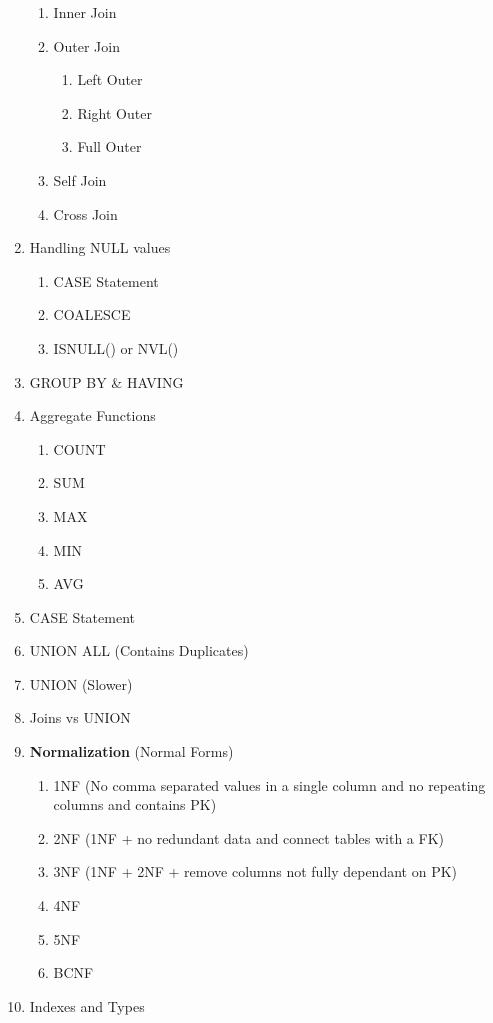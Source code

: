 \documentclass[11pt]{article}
\begin{document}
\begin{enumerate}
   \begin{enumerate}
   	\item Inner Join
   	\item Outer Join
   	\begin{enumerate}
   		\item Left Outer
   		\item Right Outer
   		\item Full Outer 
   	\end{enumerate}
   \item Self Join
   \item Cross Join
   \end{enumerate}
    \item Handling NULL values
    \begin{enumerate}
    	\item CASE Statement
    	\item COALESCE
    	\item ISNULL() or NVL()
    \end{enumerate}
    \item GROUP BY \& HAVING
    \item Aggregate Functions
    \begin{enumerate}
    	\item COUNT
    	\item SUM
    	\item MAX
    	\item MIN
    	\item AVG
    \end{enumerate}
   \item CASE Statement
    \item UNION ALL (Contains Duplicates)
    \item UNION (Slower)
    \item Joins vs UNION
	\item \textbf{Normalization} (Normal Forms)
	\begin{enumerate}
		\item 1NF (No comma separated values in a single column and no repeating columns and contains PK)
		\item 2NF (1NF + no redundant data and connect tables with a FK)
		\item 3NF (1NF + 2NF + remove columns not fully dependant on PK)
		\item 4NF
		\item 5NF
		\item BCNF		
	\end{enumerate}
\item Indexes and Types

\end{enumerate}
\end{document}
